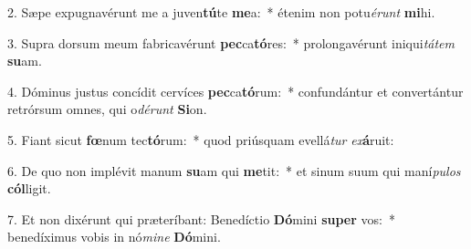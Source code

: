 2. Sæpe expugnavérunt me a juven\textbf{tú}te \textbf{me}a:~*  étenim non potu\textit{é}\textit{runt} \textbf{mi}hi.\

3. Supra dorsum meum fabricavérunt \textbf{pec}ca\textbf{tó}res:~*  prolongavérunt iniqui\textit{tá}\textit{tem} \textbf{su}am.\

4. Dóminus justus concídit cervíces \textbf{pec}ca\textbf{tó}rum:~*  confundántur et convertántur retrórsum omnes, qui o\textit{dé}\textit{runt} \textbf{Si}on.\

5. Fiant sicut \textbf{fœ}num tec\textbf{tó}rum:~*  quod priúsquam evellá\textit{tur} \textit{ex}\textbf{á}ruit:\

6. De quo non implévit manum \textbf{su}am qui \textbf{me}tit:~*  et sinum suum qui maní\textit{pu}\textit{los} \textbf{cól}ligit.\

7. Et non dixérunt qui præteríbant: Benedíctio \textbf{Dó}mini \textbf{su}\textbf{per} vos:~*  benedíximus vobis in nó\textit{mi}\textit{ne} \textbf{Dó}mini.\

